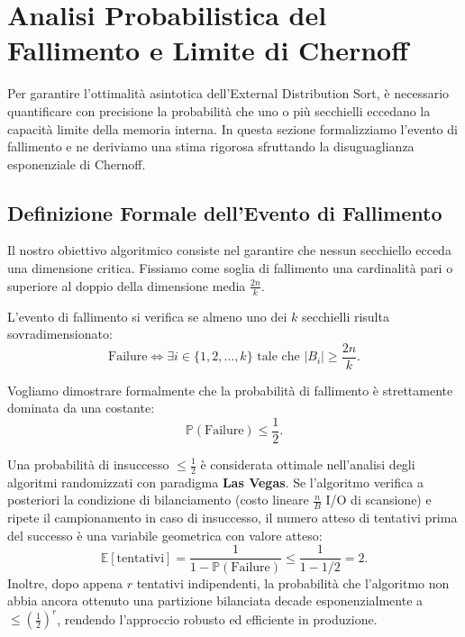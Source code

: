 \FloatBarrier
\section{Analisi Probabilistica del Fallimento e Limite di Chernoff}
\label{sec:failure-analysis-chernoff}

Per garantire l'ottimalit\`a asintotica dell'External Distribution Sort, \`e necessario quantificare con precisione la probabilit\`a che uno o pi\`u secchielli eccedano la capacit\`a limite della memoria interna. In questa sezione formalizziamo l'evento di fallimento e ne deriviamo una stima rigorosa sfruttando la disuguaglianza esponenziale di Chernoff.

\FloatBarrier
\subsection{Definizione Formale dell'Evento di Fallimento}
Il nostro obiettivo algoritmico consiste nel garantire che nessun secchiello ecceda una dimensione critica. Fissiamo come soglia di fallimento una cardinalità pari o superiore al doppio della dimensione media $\frac{2n}{k}$.

\begin{definition}
L'evento di fallimento si verifica se almeno uno dei $k$ secchielli risulta sovradimensionato:
\begin{equation}
  \text{Failure} \iff \exists i \in \{1, 2, \dots, k\} \text{ tale che } |B_i| \ge \frac{2n}{k}.
  \label{eq:failure-definition}
\end{equation}
\end{definition}

Vogliamo dimostrare formalmente che la probabilità di fallimento è strettamente dominata da una costante:
\begin{equation}
  \mathbb{P}(\text{Failure}) \le \frac{1}{2}.
\end{equation}

\begin{property}
Una probabilità di insuccesso $\le \frac{1}{2}$ è considerata ottimale nell'analisi degli algoritmi randomizzati con paradigma \textbf{Las Vegas}. 
Se l'algoritmo verifica a posteriori la condizione di bilanciamento (costo lineare $\frac{n}{B}$ I/O di scansione) e ripete il campionamento in caso di insuccesso, il numero atteso di tentativi prima del successo è una variabile geometrica con valore atteso:
\begin{equation}
  \mathbb{E}[\text{tentativi}] = \frac{1}{1 - \mathbb{P}(\text{Failure})} \le \frac{1}{1 - 1/2} = 2.
\end{equation}
Inoltre, dopo appena $r$ tentativi indipendenti, la probabilità che l'algoritmo non abbia ancora ottenuto una partizione bilanciata decade esponenzialmente a $\le \left(\frac{1}{2}\right)^r$, rendendo l'approccio robusto ed efficiente in produzione.
\end{property}

